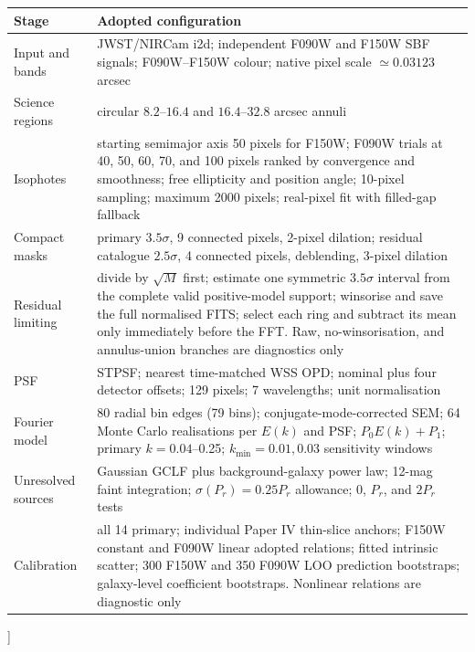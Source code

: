 \documentclass[nodoi,nocopyright]{pas}
\begin{document}
{\begin{minipage}{\textwidth}
\par\medskip
\begin{minipage}{\textwidth}
\tableshowtrue
\centering
{}
\label{tab:processing-parameters}
\tablefont
\begin{tabular}{p{}p{}}
\toprule
Stage & Adopted configuration \\
\midrule
Input and bands & JWST/NIRCam i2d; independent F090W and F150W SBF signals; F090W--F150W colour; native pixel scale $\simeq0.03123$ arcsec \\
Science regions & circular $8.2$--$16.4$ and $16.4$--$32.8$ arcsec annuli \\
Isophotes & starting semimajor axis 50 pixels for F150W; F090W trials at 40, 50, 60, 70, and 100 pixels ranked by convergence and smoothness; free ellipticity and position angle; 10-pixel sampling; maximum 2000 pixels; real-pixel fit with filled-gap fallback \\
Compact masks & primary $3.5\sigma$, 9 connected pixels, 2-pixel dilation; residual catalogue $2.5\sigma$, 4 connected pixels, deblending, 3-pixel dilation \\
Residual limiting & divide by $\sqrt{M}$ first; estimate one symmetric $3.5\sigma$ interval from the complete valid positive-model support; winsorise and save the full normalised FITS; select each ring and subtract its mean only immediately before the FFT. Raw, no-winsorisation, and annulus-union branches are diagnostics only \\
PSF & STPSF; nearest time-matched WSS OPD; nominal plus four detector offsets; 129 pixels; 7 wavelengths; unit normalisation \\
Fourier model & 80 radial bin edges (79 bins); conjugate-mode-corrected SEM; 64 Monte Carlo realisations per $E(k)$ and PSF; $P_0E(k)+P_1$; primary $k=0.04$--0.25; $k_{\min}=0.01,0.03$ sensitivity windows \\
Unresolved sources & Gaussian GCLF plus background-galaxy power law; 12-mag faint integration; $\sigma(P_r)=0.25P_r$ allowance; $0$, $P_r$, and $2P_r$ tests \\
Calibration & all 14 primary; individual Paper IV thin-slice anchors; F150W constant and F090W linear adopted relations; fitted intrinsic scatter; 300 F150W and 350 F090W LOO prediction bootstraps; galaxy-level coefficient bootstraps. Nonlinear relations are diagnostic only \\
\bottomrule
\end{tabular}
\end{minipage}
\par\medskip
\end{minipage}
\par\medskip
}]
\end{document}
